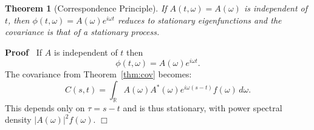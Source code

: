 \documentclass{article}
\newenvironment{proof}{\noindent\textbf{Proof\ }}{\hspace*{\fill}$\Box$\medskip}
\newtheorem{theorem}{Theorem}
\begin{document}
\begin{theorem}
  [Correspondence Principle]
  If $A(t,\omega) = A(\omega)$ is independent of $t$, then $\phi(t,\omega) = A(\omega) e^{i\omega t}$ reduces to stationary eigenfunctions and the covariance is that of a stationary process.
\end{theorem}

\begin{proof}
If $A$ is independent of $t$ then
\[
\phi(t,\omega) = A(\omega) e^{i \omega t}.
\]
The covariance from Theorem~\ref{thm:cov} becomes:
\[
C(s,t) = \int_{\mathbb{R}} A(\omega) A^*(\omega) e^{i\omega(s-t)} f(\omega)\, d\omega.
\]
This depends only on $\tau = s-t$ and is thus stationary, with power spectral density $|A(\omega)|^2 f(\omega)$.
\end{proof}
\end{document}
